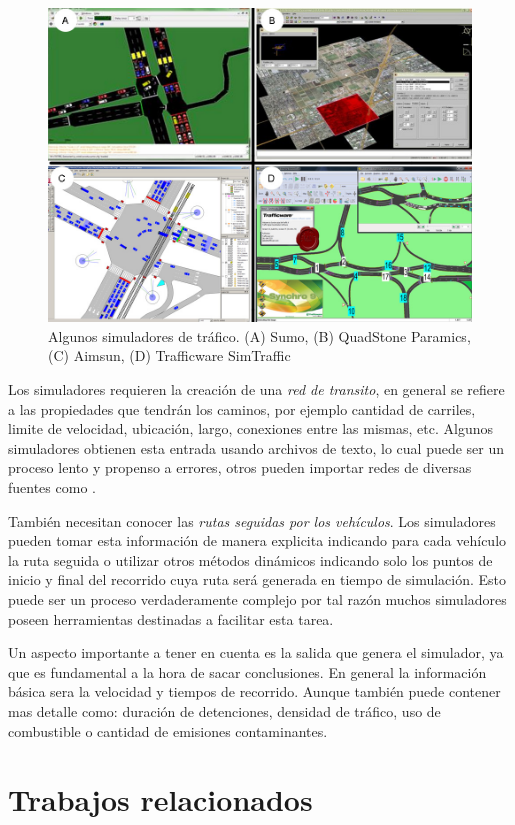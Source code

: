 \begin{figure}[H]
	\centering
	\includegraphics[width=0.7\linewidth]{Figures/simuladores}
	\caption[]{Algunos simuladores de tráfico. (A) Sumo, (B) QuadStone Paramics, (C) Aimsun, (D) Trafficware SimTraffic}
	\label{fig:simuladores}
\end{figure}

Los simuladores requieren la creación de una \emph{red de transito}, en general se refiere a las propiedades que tendrán los caminos, por ejemplo cantidad de carriles, limite de velocidad, ubicación, largo, conexiones entre las mismas, etc. Algunos simuladores obtienen esta entrada usando archivos de texto, lo cual puede ser un proceso lento y propenso a errores, otros pueden importar redes de diversas fuentes como \citet{OSM}.

También necesitan conocer las\emph{ rutas seguidas por los vehículos}. Los simuladores pueden tomar esta información de manera explicita indicando para cada vehículo la ruta seguida o utilizar otros métodos dinámicos indicando solo los puntos de inicio y final del recorrido cuya ruta será generada en tiempo de simulación. Esto puede ser un proceso verdaderamente complejo por tal razón muchos simuladores poseen herramientas destinadas a facilitar esta tarea.

Un aspecto importante a tener en cuenta es la salida que genera el simulador, ya que es fundamental a la hora de sacar conclusiones. En general la información básica sera la velocidad y tiempos de recorrido. Aunque también puede contener mas detalle como: duración de detenciones, densidad de tráfico, uso de combustible o cantidad de emisiones contaminantes.  
 


\section{Trabajos relacionados}

